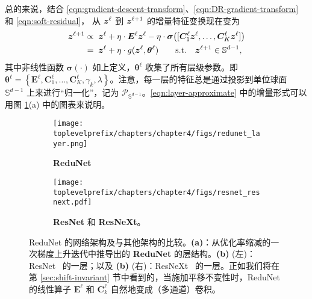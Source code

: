 \documentclass[../../book-main.tex]{subfiles}
\begin{document}
总的来说，结合 \eqref{eqn:gradient-descent-transform}、\eqref{eqn:DR-gradient-transform} 和 \eqref{eqn:soft-residual}，
从 $\bm{z}^{\ell}$ 到 $\bm{z}^{\ell+1}$ 的增量特征变换现在变为
\begin{equation}\label{eqn:layer-approximate}
\begin{aligned}
\bm{z}^{\ell+1}  &\propto \; \bm{z}^\ell +  \eta \cdot  \bm E^{\ell} \bm{z}^{\ell} - \eta\cdot  \bm \sigma\big([\bm{C}^{\ell}_{1} \bm{z}^{\ell}, \dots, \bm{C}^{\ell}_{K} \bm{z}^{\ell}]\big)  \\
&= \; \bm{z}^\ell +  \eta \cdot g(\bm{z}^\ell, \bm \theta^\ell) \qquad \mbox{s.t.} \quad \bm{z}^{\ell +1} \in \mathbb{S}^{d-1},
\end{aligned}
\end{equation}
其中非线性函数 $\bm \sigma(\cdot)$ 如上定义，$\bm \theta^\ell$ 收集了所有层级参数。即 $\bm \theta^\ell =\left\{\bm E^\ell, \bm{C}^{\ell}_{1}, \dots, \bm{C}^{\ell}_{K}, \gamma_{k}, \lambda\right\}$。注意，每一层的特征总是通过投影到单位球面 $\mathbb S^{d-1}$ 上来进行“归一化”，记为 $\mathcal P_{\mathbb S^{d-1}}$。\eqref{eqn:layer-approximate} 中的增量形式可以用图 \ref{fig:arch-ReduNet}(a) 中的图表来说明。

\begin{figure}[t]
    \begin{subfigure}[t]{0.35\textwidth}
        \centering
        \texttt{[image: \\toplevelprefix/chapters/chapter4/figs/redunet\_layer.png]}
        \caption{\textbf{ReduNet}}
    \end{subfigure}
    \hfill
    \begin{subfigure}[t]{0.6\textwidth}
        \centering
        \texttt{[image: \\toplevelprefix/chapters/chapter4/figs/resnet\_resnext.pdf]}
        \caption{\textbf{ResNet} 和 \textbf{ResNeXt}。}
    \end{subfigure}
    \caption{\small ReduNet 的网络架构及与其他架构的比较。\textbf{(a)}：从优化率缩减的一次梯度上升迭代中推导出的 \textbf{ReduNet} 的层结构。\textbf{(b)} (左)：ResNet~\cite{he2016deep} 的一层；以及 \textbf{(b)} (右)：ResNeXt~\cite{ResNEXT} 的一层。正如我们将在第 \ref{sec:shift-invariant} 节中看到的，当施加平移不变性时，ReduNet 的线性算子 $\bm E^\ell$ 和 $\bm{C}_k^\ell$ 自然地变成（多通道）卷积。}
    \label{fig:arch-ReduNet}
\end{figure}
\end{document}
